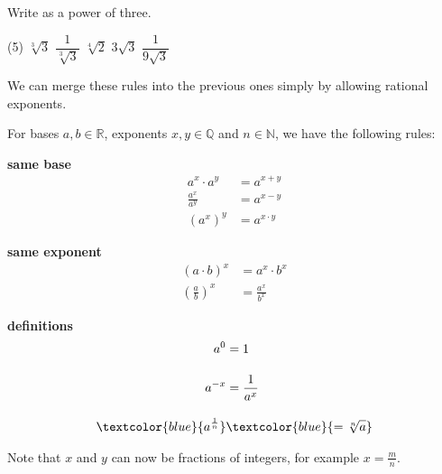 \begin{exercise}
	Write as a power of three.
	\begin{tasks}(5)
		\task $\sqrt[3]{3}$
		\task $\dfrac{1}{\sqrt[3]{3}}$
		\task $\sqrt[4]{2}$
		\task $3\sqrt{3}$
		\task $\dfrac{1}{9\sqrt{3}}$
	\end{tasks}
\end{exercise}
We can merge these rules into the previous ones simply by allowing rational exponents.
\begin{tcolorbox}
	For bases $a,b\in\mathbb R$, exponents $x,y\in\mathbb Q$ and $n\in\mathbb N$, we have the following rules:
	\begin{multicols}{3}
		\centering
		\textbf{same base}\\
		\begin{align*}
			a^x\cdot a^y&=a^{x+y} \\[10pt]
			\frac{a^x}{a^y}&=a^{x-y} \\[10pt]
			\left(a^x\right)^y&=a^{x\cdot y}
		\end{align*}
		\vfill
		\columnbreak
		
		\textbf{same exponent}\\
		\begin{align*}
			\left(a\cdot b\right)^x&=a^x\cdot b^x \\[10pt]
			\left(\frac{a}{b}\right)^x&=\frac{a^x}{b^x}
		\end{align*}
		\vfill
		\columnbreak
		
		\textbf{definitions}\\
		\begin{align*}
			a^0&=1 \\[10pt]
			a^{-x}&=\frac{1}{a^x} \\[10pt]
			\textcolor{blue}{a^{\frac{1}{n}}}&\textcolor{blue}{=\sqrt[n]{a}}
		\end{align*}
		\vfill
	\end{multicols}
	Note that $x$ and $y$ can now be fractions of integers, for example $x=\frac{m}{n}$.
\end{tcolorbox}